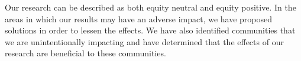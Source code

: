 Our research can be described as both equity neutral and equity positive. In the areas in which our results may 
have an adverse impact, we have proposed solutions in order to lessen the effects. We have also identified 
communities that we are unintentionally impacting and have determined that the effects of our research are 
beneficial to these communities.
